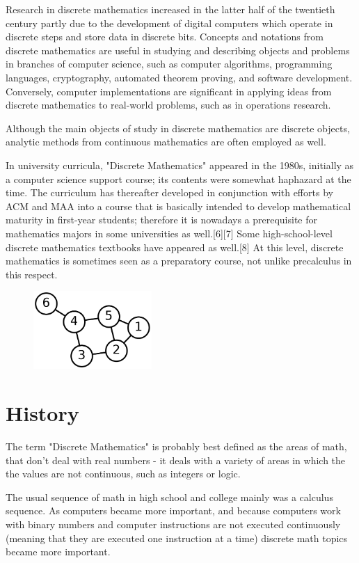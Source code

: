 \documentclass{article}
\begin{document}
Research in discrete mathematics increased in the latter half of the twentieth century partly due to the development of digital computers which operate in discrete steps and store data in discrete bits. Concepts and notations from discrete mathematics are useful in studying and describing objects and problems in branches of computer science, such as computer algorithms, programming languages, cryptography, automated theorem proving, and software development. Conversely, computer implementations are significant in applying ideas from discrete mathematics to real-world problems, such as in operations research.

Although the main objects of study in discrete mathematics are discrete objects, analytic methods from continuous mathematics are often employed as well.

In university curricula, "Discrete Mathematics" appeared in the 1980s, initially as a computer science support course; its contents were somewhat haphazard at the time. The curriculum has thereafter developed in conjunction with efforts by ACM and MAA into a course that is basically intended to develop mathematical maturity in first-year students; therefore it is nowadays a prerequisite for mathematics majors in some universities as well.[6][7] Some high-school-level discrete mathematics textbooks have appeared as well.[8] At this level, discrete mathematics is sometimes seen as a preparatory course, not unlike precalculus in this respect.
\begin{figure}[h]
\includegraphics[width=0.4\textwidth]{sa.png}
\caption{}
\end{figure}
\newpage
\section{History}
The term "Discrete Mathematics" is probably best defined as the areas of math, that don't deal with real numbers - it deals with a variety of areas in which the the values are not continuous, such as integers or logic.

The usual sequence of math in high school and college mainly was a calculus sequence. As computers became more important, and because computers work with binary numbers and computer instructions are not executed continuously (meaning that they are executed one instruction at a time) discrete math topics became more important.
\end{document}
